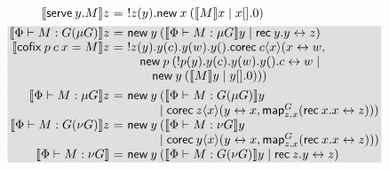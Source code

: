 \documentclass[orivec,envcountsame]{llncs}
\makeatletter
\newcommand{\gvtyp}[3]{#1 \vdash #2 : #3}
\newcommand{\mapname}{\mathsf{map}}
\newcommand{\map}[3]{\mapname^{#1}_{#2}(#3)}
\newcommand{\mkwd}[1]{\mathsf{#1}}
\newcommand{\link}[2]{#1 \leftrightarrow #2}
\newcommand{\cut}[4]{\mkwd{new}\:#1 \: (#3 \mid #4)}
\newcommand{\replicate}[2]{{!#1(#2)}}
\newcommand{\rec}[1]{\mkwd{rec}\:#1}
\newcommand{\corec}[4]{\mkwd{corec}\:{#1} \langle #2 \rangle (#3,#4)}
\newcommand{\lrkwd}{\mkwd{cofix}}
\newcommand{\gvfix}[3]{\lrkwd\:#1\:#2 = #3}
\newcommand{\gvserve}[2]{\mkwd{serve}\:#1.#2}
\newcommand{\key}{\mkwd}
\newcommand{\tocpbig}[1]{\left\llbracket #1 \right\rrbracket}
\newcommand{\tocp}[1]{\llbracket #1 \rrbracket}
\newcommand{\ba}{\begin{array}}
\newcommand{\ea}{\end{array}}
\newcommand{\bl}{\ba[t]{@{}l@{}}}
\newcommand{\el}{\ea}
\newenvironment{equations}{\[\ba{@{}r@{~}c@{~}l@{}}}{\ea\]}
\newcommand\shade[1]{\setlength{\fboxsep}{0pt}\colorbox{shade}{\ensuremath{#1}}}
\newcommand\shaderow{\noalign{\vskip-0.4pt}\rowcolor{shade}[0.6mm]}
\makeatother
\begin{document}
\begin{figure}[float]
\begin{equations}
\tocp{\gvserve{y}{M}}z &=& \replicate{z}{y}.\cut{x}{}{\tocp{M}x}{x[].0} \\[1ex] \shaderow
\tocp{\gvtyp{\Phi}{M}{G(\mu G)}}z &=&
  \cut{y}{\nu \tocp{G}}{\tocp{\gvtyp{\Phi}{M}{\mu G}}y}{\rec{y}.\link{y}{z}} \\ \shaderow
\tocp{\gvfix{p}{c\:x}{M}}z &=&
\replicate{z}{y}.y(c).y(w).y().
 \corec{c}{x}{\link{x}{w}}{\\ \shaderow
&& \quad \cut{p}{}{\replicate{p}{y}.y(c).y(w).y().\link{c}{w}}
                  {\\ \shaderow && \qquad \cut{y}{}{\tocp{M}y}{y[].0}}} \\[1ex]
\shaderow
\tocp{\gvtyp{\Phi}{M}{\mu G}}z &=&
\key{new}\:y\:
  \bl
  (
       \tocp{\gvtyp{\Phi}{M}{G(\mu G)}}y \\
  \mid \corec{z}{x}
             {\link{y}{x}}
             {\map{G}{z,x}{\rec{x}.\link{x}{z}}}) \\
  \el \\ \shaderow
\tocp{\gvtyp{\Phi}{M}{G(\nu G)}}z &=&
\key{new}\:y\:
  \bl
  (
       \tocp{\gvtyp{\Phi}{M}{\nu G}}y \\
  \mid \corec{y}{x}
             {\link{y}{x}}
             {\map{G}{z,x}{\rec{x}.\link{x}{z}}}) \\
  \el \\ \shaderow
\tocp{\gvtyp{\Phi}{M}{\nu G}} &=&
  \cut{y}{\nu \tocp{G}}{\tocp{\gvtyp{\Phi}{M}{G(\nu G)}}y}{\rec{z}.\link{y}{z}} \\
\end{equations}%

\end{figure}
\end{document}
